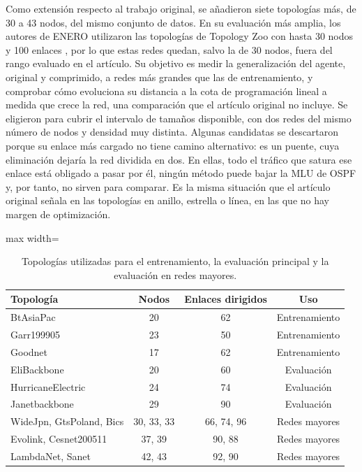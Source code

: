 Como extensión respecto al trabajo original, se añadieron siete topologías más, de 30 a 43 nodos, del mismo conjunto de datos. En su evaluación más amplia, los autores de ENERO utilizaron las topologías de Topology Zoo con hasta 30 nodos y 100 enlaces \cite{ALMASAN2022109166}, por lo que estas redes quedan, salvo la de 30 nodos, fuera del rango evaluado en el artículo. Su objetivo es medir la generalización del agente, original y comprimido, a redes más grandes que las de entrenamiento, y comprobar cómo evoluciona su distancia a la cota de programación lineal a medida que crece la red, una comparación que el artículo original no incluye. Se eligieron para cubrir el intervalo de tamaños disponible, con dos redes del mismo número de nodos y densidad muy distinta. Algunas candidatas se descartaron porque su enlace más cargado no tiene camino alternativo: es un puente, cuya eliminación dejaría la red dividida en dos. En ellas, todo el tráfico que satura ese enlace está obligado a pasar por él, ningún método puede bajar la MLU de OSPF y, por tanto, no sirven para comparar. Es la misma situación que el artículo original señala en las topologías en anillo, estrella o línea, en las que no hay margen de optimización.

\begin{table}[H]
	\centering
	\small
	\begin{adjustbox}{max width=\textwidth}
	\begin{tabular}{lccc}
		\toprule
		\textbf{Topología} & \textbf{Nodos} & \textbf{Enlaces dirigidos} & \textbf{Uso} \\
		\midrule
		BtAsiaPac & 20 & 62 & Entrenamiento \\
		Garr199905 & 23 & 50 & Entrenamiento \\
		Goodnet & 17 & 62 & Entrenamiento \\
		\midrule
		EliBackbone & 20 & 60 & Evaluación \\
		HurricaneElectric & 24 & 74 & Evaluación \\
		Janetbackbone & 29 & 90 & Evaluación \\
		\midrule
		WideJpn, GtsPoland, Bics & 30, 33, 33 & 66, 74, 96 & Redes mayores \\
		Evolink, Cesnet200511 & 37, 39 & 90, 88 & Redes mayores \\
		LambdaNet, Sanet & 42, 43 & 92, 90 & Redes mayores \\
		\bottomrule
	\end{tabular}
	\end{adjustbox}
	\caption{Topologías utilizadas para el entrenamiento, la evaluación principal y la evaluación en redes mayores.}
	\label{tab:topologias}
\end{table}

